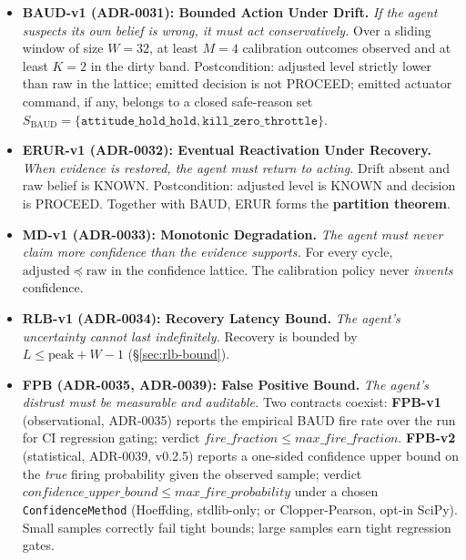\documentclass[11pt,a4paper]{article}
\begin{document}
\begin{itemize}
  \item \textbf{BAUD-v1 (ADR-0031): Bounded Action Under Drift.}
        \emph{If the agent suspects its own belief is wrong, it
        must act conservatively.} Over a sliding window of size
        $W=32$, at least $M=4$ calibration outcomes observed and
        at least $K=2$ in the dirty band. Postcondition: adjusted
        level strictly lower than raw in the lattice; emitted
        decision is not PROCEED; emitted actuator command, if
        any, belongs to a closed safe-reason set
        $S_{\mathrm{BAUD}} = \{\texttt{attitude\_hold\_hold}, \texttt{kill\_zero\_throttle}\}$.
  \item \textbf{ERUR-v1 (ADR-0032): Eventual Reactivation Under
        Recovery.} \emph{When evidence is restored, the agent
        must return to acting.} Drift absent and raw belief is
        KNOWN. Postcondition: adjusted level is KNOWN and decision
        is PROCEED. Together with BAUD, ERUR forms the
        \textbf{partition theorem}.
  \item \textbf{MD-v1 (ADR-0033): Monotonic Degradation.}
        \emph{The agent must never claim more confidence than the
        evidence supports.} For every cycle,
        $\mathrm{adjusted} \preceq \mathrm{raw}$ in the confidence
        lattice. The calibration policy never \emph{invents}
        confidence.
  \item \textbf{RLB-v1 (ADR-0034): Recovery Latency Bound.}
        \emph{The agent's uncertainty cannot last indefinitely.}
        Recovery is bounded by $L \le \mathrm{peak} + W - 1$
        (\S\ref{sec:rlb-bound}).
  \item \textbf{FPB (ADR-0035, ADR-0039): False Positive Bound.}
        \emph{The agent's distrust must be measurable and
        auditable.} Two contracts coexist:
        \textbf{FPB-v1} (observational, ADR-0035) reports the
        empirical BAUD fire rate over the run for CI regression
        gating; verdict
        $\mathit{fire\_fraction} \le \mathit{max\_fire\_fraction}$.
        \textbf{FPB-v2} (statistical, ADR-0039, v0.2.5) reports
        a one-sided confidence upper bound on the \emph{true}
        firing probability given the observed sample; verdict
        $\mathit{confidence\_upper\_bound} \le \mathit{max\_fire\_probability}$
        under a chosen \texttt{ConfidenceMethod} (Hoeffding,
        stdlib-only; or Clopper-Pearson, opt-in SciPy).
        Small samples correctly fail tight bounds; large
        samples earn tight regression gates.
\end{itemize}
\end{document}
